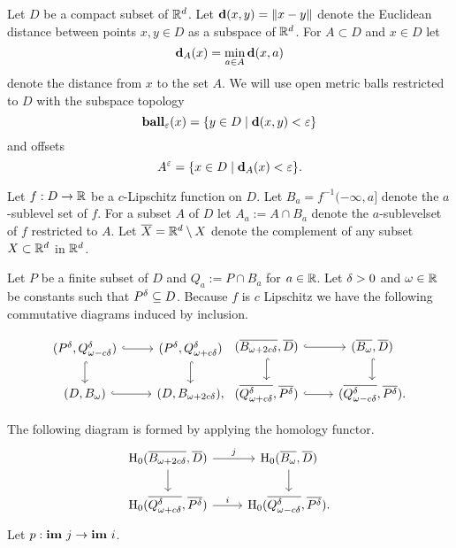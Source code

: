 
Let $D$ be a compact subset of $\R^d$.
Let $\dist(x, y) = \|x - y\|$ denote the Euclidean distance between points $x,y\in D$ as a subspace of $\R^d$.
For $A\subset D$ and $x\in D$ let
\[\dist_A(x) = \min_{a\in A}\dist(x, a)\]
denote the distance from $x$ to the set $A$.
We will use open metric balls restricted to $D$ with the subspace topology
\[\ball_\e(x) = \{y\in D\mid \dist(x, y) < \e\}\]
and offsets
\[A^\e = \{x\in D\mid \dist_A(x) < \e\}.\]

Let $f : D\to \R$ be a $c$-Lipschitz function on $D$.
Let $B_a = f^{-1}(-\infty, a]$ denote the $a$-sublevel set of $f$.
For a subset $A$ of $D$ let $A_a := A\cap B_a$ denote the $a$-sublevelset of $f$ restricted to $A$.
Let $\overline{X} = \R^d\setminus X$ denote the complement of any subset $X\subset\R^d$ in $\R^d$.


Let $P$ be a finite subset of $D$ and $Q_a := P\cap B_a$ for $a\in\R$.
Let $\of > 0 $ and $\omega\in \R$ be constants such that $\P\subseteq D$.
Because $f$ is $c$ Lipschitz we have the following commutative diagrams induced by inclusion.

\[ \begin{tikzcd}
  (\P, \Q^\of) \arrow[hookrightarrow]{r}\arrow[hookrightarrow]{d} &
  (\P, \QQ^\of) \arrow[hookrightarrow]{d} \\
  (D, \bb) \arrow[hookrightarrow]{r} &
  (D, \BB),
\end{tikzcd}\begin{tikzcd}
  (\cmp{\BB},\cmp{D})\arrow[hookrightarrow]{d}\arrow[hookrightarrow]{r} & %
  (\cmp{\bb}, \cmp{D}) \arrow[hookrightarrow]{d}\\
  (\cmp{\QQ^\of}, \cmp{\P}) \arrow[hookrightarrow]{r} & %
  (\cmp{\Q^\of}, \cmp{\P}).
\end{tikzcd}\]

The following diagram is formed by applying the homology functor.
\begin{equation}\label{dgm:1}\begin{tikzcd}
  \hom_0(\cmp{\BB},\cmp{D})\arrow{d} \arrow{r}{j} & %
  \hom_0(\cmp{\bb}, \cmp{D}) \arrow{d} \\
  \hom_0(\cmp{\QQ^\of}, \cmp{\P}) \arrow{r}{i} & %
  \hom_0(\cmp{\Q^\of}, \cmp{\P}).
\end{tikzcd}\end{equation}
Let $p : \im~j\to\im~i$.

